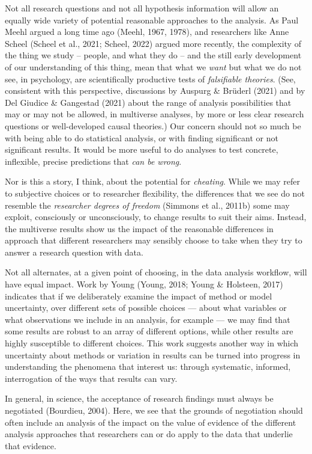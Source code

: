 \documentclass[
  letterpaper,
  DIV=11,
  numbers=noendperiod]{scrreprt}
\begin{document}
Not all research questions and not all hypothesis information will allow
an equally wide variety of potential reasonable approaches to the
analysis. As Paul Meehl argued a long time ago (Meehl, 1967, 1978), and
researchers like Anne Scheel (Scheel et al., 2021; Scheel, 2022) argued
more recently, the complexity of the thing we study -- people, and what
they do -- and the still early development of our understanding of this
thing, mean that what we \emph{want} but what we do not see, in
psychology, are scientifically productive tests of \emph{falsifiable
theories}. (See, consistent with this perspective, discussions by
Auspurg \& Brüderl (2021) and by Del Giudice \& Gangestad (2021) about
the range of analysis possibilities that may or may not be allowed, in
multiverse analyses, by more or less clear research questions or
well-developed causal theories.) Our concern should not so much be with
being able to do statistical analysis, or with finding significant or
not significant results. It would be more useful to do analyses to test
concrete, inflexible, precise predictions that \emph{can be wrong}.

Nor is this a story, I think, about the potential for \emph{cheating}.
While we may refer to subjective choices or to researcher flexibility,
the differences that we see do not resemble the \emph{researcher degrees
of freedom} (Simmons et al., 2011b) some may exploit, consciously or
unconsciously, to change results to suit their aims. Instead, the
multiverse results show us the impact of the reasonable differences in
approach that different researchers may sensibly choose to take when
they try to answer a research question with data.

Not all alternates, at a given point of choosing, in the data analysis
workflow, will have equal impact. Work by Young (Young, 2018; Young \&
Holsteen, 2017) indicates that if we deliberately examine the impact of
method or model uncertainty, over different sets of possible choices ---
about what variables or what observations we include in an analysis, for
example --- we may find that some results are robust to an array of
different options, while other results are highly susceptible to
different choices. This work suggests another way in which uncertainty
about methods or variation in results can be turned into progress in
understanding the phenomena that interest us: through systematic,
informed, interrogation of the ways that results can vary.

In general, in science, the acceptance of research findings must always
be negotiated (Bourdieu, 2004). Here, we see that the grounds of
negotiation should often include an analysis of the impact on the value
of evidence of the different analysis approaches that researchers can or
do apply to the data that underlie that evidence.
\end{document}
